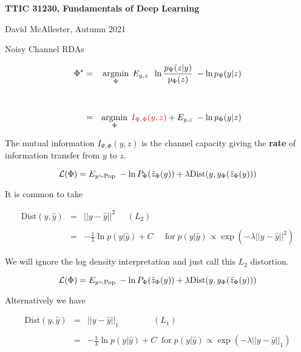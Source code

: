 




{\Huge

  \centerline{\bf TTIC 31230, Fundamentals of Deep Learning}
  \bigskip
  \centerline{David McAllester, Autumn 2021}
  \vfill
  \centerline{Noisy Channel RDAs}
  \vfill
  \vfill



\begin{eqnarray*}
\Phi^* & = & \operatorname*{argmin}_\Phi\; E_{y,z} \;\; \ln \frac{p_\Psi(z | y)}{p_\Phi(z)}\; - \ln p_\Phi(y|z) \\
\\
\\
 & = & \operatorname*{argmin}_\Phi \;{\color{red} I_{\Psi,\Phi}(y,z)} + E_{y,z}\; - \ln p_\Phi(y|z)
\end{eqnarray*}

\vfill
The mutual information {\color{red} $I_{\Psi,\Phi}(y,z)$} is the channel capacity giving the {\bf rate} of information transfer from $y$ to $z$.


$${\cal L}(\Phi) = E_{y \sim \mathrm{Pop}}\;-\ln P_\Phi(\tilde{z}_\Phi(y)) + \lambda\mathrm{Dist}(y,y_\Phi(\tilde{z}_\Phi(y)))$$

\vfill
It is common to take

\begin{eqnarray*}
\mathrm{Dist}(y,\hat{y}) & = & ||y-\hat{y}||^2 \;\;\;\;\;(L_2) \\
\\
& = & -\frac{1}{\lambda}\ln p(y|\hat{y}) + C \;\;\;\;\;\mbox{for}\;p(y|\hat{y}) \propto \exp(-\lambda||y-\hat{y}||^2)
\end{eqnarray*}

\vfill
We will ignore the log density interpretation and just call this $L_2$ distortion.


$${\cal L}(\Phi) = E_{y \sim \mathrm{Pop}}\;-\ln P_\Phi(\tilde{z}_\Phi(y)) + \lambda \mathrm{Dist}(y,y_\Phi(\tilde{z}_\Phi(y)))$$

Alternatively we have

\begin{eqnarray*}
\mathrm{Dist}(y,\hat{y}) & = & ||y-\hat{y}||_1 \hspace{4em}(L_1) \\
\\
& = & -\frac{1}{\lambda}\ln p(y|\hat{y}) + C \;\;\mbox{for}\;p(y|\hat{y}) \propto \exp(-\lambda ||y-\hat{y}||_1)
\end{eqnarray*}

}
